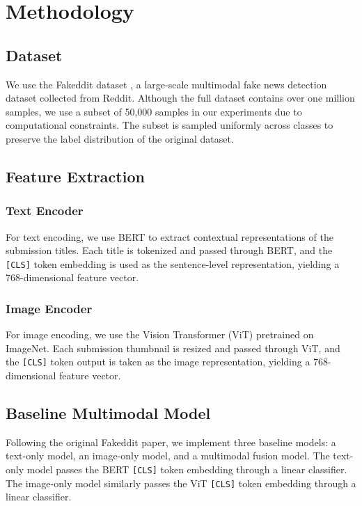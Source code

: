\section{Methodology}

\subsection{Dataset}

We use the Fakeddit dataset \cite{fakeddit}, a large-scale multimodal fake news detection dataset collected from Reddit. Although the full dataset contains over one million samples, we use a subset of 50,000 samples in our experiments due to computational constraints. The subset is sampled uniformly across classes to preserve the label distribution of the original dataset.

\subsection{Feature Extraction}

\subsubsection{Text Encoder}
For text encoding, we use BERT to extract contextual representations of the submission titles. Each title is tokenized and passed through BERT, and the \texttt{[CLS]} token embedding is used as the sentence-level representation, yielding a 768-dimensional feature vector.

\subsubsection{Image Encoder}
For image encoding, we use the Vision Transformer (ViT) pretrained on ImageNet. Each submission thumbnail is resized and passed through ViT, and the \texttt{[CLS]} token output is taken as the image representation, yielding a 768-dimensional feature vector.

\subsection{Baseline Multimodal Model}

Following the original Fakeddit paper, we implement three baseline models: a text-only model, an image-only model, and a multimodal fusion model. The text-only model passes the BERT \texttt{[CLS]} token embedding through a linear classifier. The image-only model similarly passes the ViT \texttt{[CLS]} token embedding through a linear classifier.

